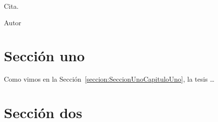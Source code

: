 \epigraph{Cita.}{Autor}

\section{Sección uno}\label{seccion:SeccionUnoCapituloDos}

Como vimos en la Sección~\ref{seccion:SeccionUnoCapituloUno}, la tesis \dots

\section{Sección dos}\label{seccion:SeccionDosCapituloDos}